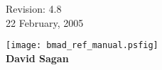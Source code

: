 \thispagestyle{empty}

\begin{flushright}
\large
  Revision: 4.8 \\
  22 February, 2005 \\
\end{flushright}

\vfill

{
\begin{center}
\texttt{[image: bmad\_ref\_manual.psfig]} \\
\vskip 0.3in
\huge\bf David Sagan
\end{center}
}

\vfill
\break
